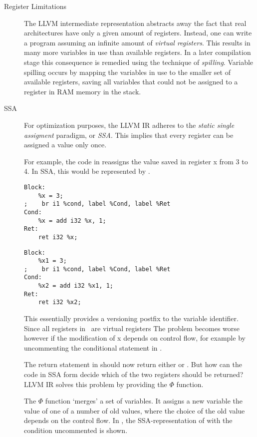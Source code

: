 \begin{description}
\item[Register Limitations]  The LLVM intermediate representation abstracts away the fact that real architectures have only a given amount of registers.
Instead, one can write a program assuming an infinite amount of \emph{virtual registers}.
This results in many more variables in use than available registers.
In a later compilation stage this consequence is remedied using the technique of \emph{spilling}.
Variable spilling occurs by mapping the variables in use to the smaller set of available registers, saving all variables that could not be assigned to a register in RAM memory in the stack.

\item[SSA] For optimization purposes, the LLVM IR adheres to the \emph{static single assigment} paradigm, or \emph{SSA}.
This implies that every register can be assigned a value only once.

For example, the code in  reassigns the value saved in register x from 3 to  4. In SSA, this would be represented by .
\begin{lstlisting}[label=lst:reassign, caption={Reassigning a variable}, frame=single, language={[x86masm]Assembler}]
Block:
    %x = 3;
;    br i1 %cond, label %Cond, label %Ret
Cond:
    %x = add i32 %x, 1;
Ret:
    ret i32 %x;
\end{lstlisting}

\begin{lstlisting}[label=lst:ssa, caption={Code in SSA form.}, frame=single, language={[x86masm]Assembler}]
Block:
    %x1 = 3;
;    br i1 %cond, label %Cond, label %Ret
Cond:
    %x2 = add i32 %x1, 1;
Ret:
    ret i32 %x2;
\end{lstlisting}
This essentially provides a versioning postfix to the variable identifier. 
Since all registers in \LLVMIR\ are virtual registers
The problem becomes worse however if the modification of x depends on control flow, for example by uncommenting the conditional statement in .

The return statement in  should now return either  or .
But how can the code in SSA form decide which of the two registers should be returned?
LLVM IR solves this problem by providing the $\Phi$ function\cite{Appel}.

The $\Phi$ function `merges' a set of variables.
It assigns a new variable the value of one of a number of old values, where the choice of the old value depends on the control flow.
In , the SSA-representation of  with the condition uncommented is shown.


\end{description}
